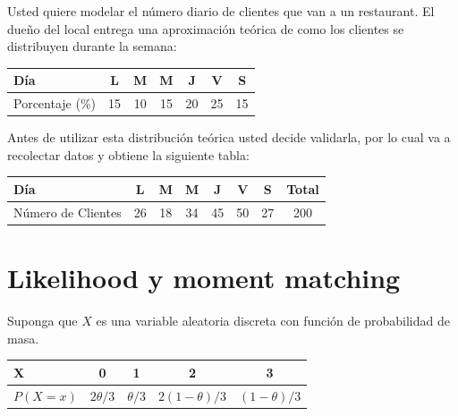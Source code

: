 \documentclass[11pt]{exam}
\begin{document}
\begin{questions}
\question Usted quiere modelar el n\'umero diario de clientes que van a un restaurant. El due\~no del local entrega una aproximaci\'on te\'orica de como los clientes se distribuyen durante la semana:

\begin{table}[!htbp]
\centering
\begin{tabular}{lcccccc}
\toprule
D\'ia&L&M&M&J&V&S\\
\midrule
Porcentaje (\%) & 15 & 10 & 15 & 20 & 25 & 15\\
\bottomrule
\end{tabular}
\end{table}

Antes de utilizar esta distribuci\'on te\'orica usted decide validarla, por lo cual va a recolectar datos y obtiene la siguiente tabla:

\begin{table}[!htbp]
\centering
\begin{tabular}{lccccccc}
\toprule
D\'ia&L&M&M&J&V&S&Total\\
\midrule
N\'umero de Clientes & 26 & 18 & 34 & 45 & 50 & 27 & 200\\
\bottomrule
\end{tabular}
\end{table}


\section*{Likelihood y moment matching}
\question Suponga que $X$ es una variable aleatoria discreta con funci\'on de probabilidad de masa.

\begin{table}[!htbp]
\centering
\begin{tabular}{lcccc}
\toprule
X&0&1&2&3\\
\midrule
$P(X=x)$ & $2\theta/3$ & $\theta/3$& $2(1-\theta)/3$ & $(1-\theta)/3$\\
\bottomrule
\end{tabular}
\end{table}


\end{questions}
\end{document}
